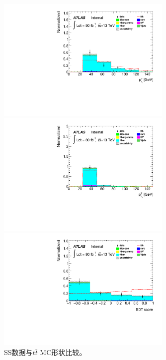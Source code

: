 \begin{figure}[htp]
\begin{minipage}[t]{0.33\linewidth}
\end{minipage}\\
\begin{minipage}[t]{0.33\linewidth}
\centering
\includegraphics[width=0.75\textwidth,angle=-90]{fig/OneL2tauSSnoBDT_norm/tau_pt_0_F.pdf}
\end{minipage}
\begin{minipage}[t]{0.33\linewidth}
\centering
\includegraphics[width=0.75\textwidth,angle=-90]{fig/OneL2tauSSnoBDT_norm/tau_pt_1_F.pdf}
\end{minipage}
\begin{minipage}[t]{0.33\linewidth}
\centering
\includegraphics[width=0.75\textwidth,angle=-90]{fig/OneL2tauSSnoBDT_norm/MVA1l2tau_weight_F.pdf}
\end{minipage}
\caption{SS数据与$t\bar{t}$ MC形状比较。}
\label{Fig:1l2tau.ssbdtvalidation}
\end{figure}

